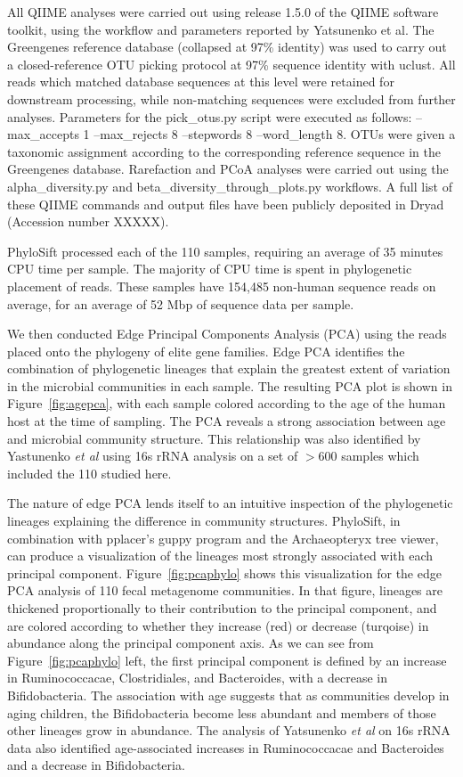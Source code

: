 \documentclass[10pt]{article}
\begin{document}
All QIIME analyses were carried out using release 1.5.0 of the QIIME software toolkit, using the workflow and parameters reported by Yatsunenko et al. The Greengenes reference database (collapsed at 97\% identity) was used to carry out a closed-reference OTU picking protocol at 97\% sequence identity with uclust. All reads which matched database sequences at this level were retained for downstream processing, while non-matching sequences were excluded from further analyses. Parameters for the pick_otus.py script were executed as follows: --max_accepts 1 --max_rejects 8 --stepwords 8 --word_length 8. OTUs were given a taxonomic assignment according to the corresponding reference sequence in the Greengenes database. Rarefaction and PCoA analyses were carried out using the alpha_diversity.py and beta_diversity_through_plots.py workflows. A full list of these QIIME commands and output files have been publicly deposited in Dryad (Accession number XXXXX).

PhyloSift processed each of the 110 samples, requiring an average of 35 minutes CPU time per sample.
The majority of CPU time is spent in phylogenetic placement of reads.
These samples have 154,485 non-human sequence reads on average, for an average of 52 Mbp of sequence data per sample.

We then conducted Edge Principal Components Analysis (PCA) using the reads placed onto the phylogeny of elite gene families.
Edge PCA identifies the combination of phylogenetic lineages that explain the greatest extent of variation in the microbial communities in each sample.
The resulting PCA plot is shown in Figure~\ref{fig:agepca}, with each sample colored according to the age of the human host at the time of sampling.
The PCA reveals a strong association between age and microbial community structure.
This relationship was also identified by Yastunenko \textit{et al} using 16s rRNA analysis on a set of $>$600 samples which included the 110 studied here.

The nature of edge PCA lends itself to an intuitive inspection of the phylogenetic lineages explaining the difference in community structures.
PhyloSift, in combination with pplacer's guppy program and the Archaeopteryx tree viewer, can produce a visualization of the lineages most strongly associated with each principal component.
Figure~\ref{fig:pcaphylo} shows this visualization for the edge PCA analysis of 110 fecal metagenome communities.
In that figure, lineages are thickened proportionally to their contribution to the principal component, and are colored according to whether they increase (red) or decrease (turqoise) in abundance along the principal component axis.
As we can see from Figure~\ref{fig:pcaphylo} left, the first principal component is defined by an increase in Ruminococcacae, Clostridiales, and Bacteroides, with a decrease in Bifidobacteria. 
The association with age suggests that as communities develop in aging children, the Bifidobacteria become less abundant and members of those other lineages grow in abundance.
The analysis of Yatsunenko \textit{et al} on 16s rRNA data also identified age-associated increases in Ruminococcacae and Bacteroides and a decrease in Bifidobacteria.
\end{document}

